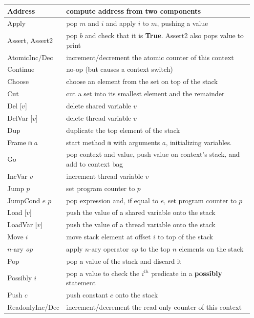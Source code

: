 \documentclass{report}
\begin{document}
{\small
\begin{tabular}{|l|l|}
\hline
Address & compute address from two components \\
\hline
Apply & pop $m$ and $i$ and apply $i$ to $m$, pushing a value \\
\hline
Assert, Assert2 & pop $b$ and check that it is \textbf{True}.  Assert2 also pops value to print \\
\hline
AtomicInc/Dec & increment/decrement the atomic counter of this context \\
\hline
Continue & no-op (but causes a context switch) \\
\hline
Choose & choose an element from the set on top of the stack \\
\hline
Cut & cut a set into its smallest element and the remainder \\
\hline
Del [$v$] & delete shared variable $v$ \\
\hline
DelVar [$v$] & delete thread variable $v$ \\
\hline
Dup & duplicate the top element of the stack \\
\hline
Frame \texttt{m} $a$ & start method \texttt{m} with arguments $a$,
initializing variables.  \\
\hline
Go & pop context and value, push value on context's stack, and add to context bag \\
\hline
IncVar $v$ & increment thread variable $v$ \\
\hline
Jump $p$ & set program counter to $p$ \\
\hline
JumpCond $e$ $p$ & pop expression and, if equal to $e$, set program counter to $p$ \\
\hline
Load [$v$] & push the value of a shared variable onto the stack \\
\hline
LoadVar [$v$] & push the value of a thread variable onto the stack \\
\hline
Move $i$ & move stack element at offset $i$ to top of the stack \\
\hline
$n$-ary \textit{op} & apply $n$-ary operator \textit{op} to the top $n$ elements on the stack \\
\hline
Pop & pop a value of the stack and discard it \\
\hline
Possibly $i$ & pop a value to check the $i^{th}$ predicate in a \textbf{possibly} statement \\
\hline
Push $c$ & push constant $c$ onto the stack \\
\hline
ReadonlyInc/Dec & increment/decrement the read-only counter of this context \\

\end{tabular}}
\end{document}
